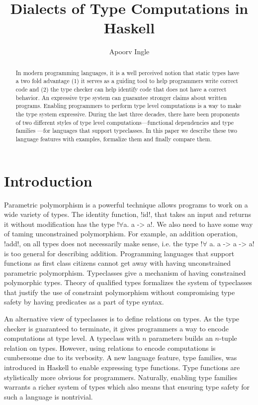 \documentclass[format=sigplan,manuscript,review,screen,nonacm,margin=1in]{acmart}
\title{Dialects of Type Computations in Haskell}
\author{Apoorv Ingle}
\affiliation{%
  \institution{University of Iowa}
  \department{Department of Computer Science}
  \streetaddress{McLean Hall}
  \city{Iowa City}
  \state{Iowa}
  \country{USA}}
\begin{document}
\begin{abstract}
In modern programming languages, it is a well perceived notion
that static types have a two fold advantage (1) it serves as a guiding tool to help programmers
write correct code and (2) the type checker can help identify
code that does not have a correct behavior. An expressive type system
can guarantee stronger claims about written programs. Enabling programmers to perform
type level computations is a way to make the type system expressive.
During the last three decades, there have been proponents
of two different styles of type level computations---functional dependencies and type families
---for languages that support typeclasses. In this paper we describe these two
language features with examples, formalize them and finally compare them.
\end{abstract}
\maketitle

\section{Introduction}
Parametric polymorphism is a powerful technique allows programs to work on
a wide variety of types. The identity function, !id!, that takes an input and returns it
without modification has the type !$\forall$a. a -> a!.
We also need to have some way of taming unconstrained polymorphism.
For example, an addition operation, !add!, on all types does not necessarily make sense,
i.e. the type !$\forall$ a. a -> a -> a! is too general for describing addition.
Programming languages that support functions as first class citizens
cannot get away with having unconstrained parametric polymorphism.
Typeclasses\cite{wadler_polymorphism_1989} give a mechanism
of having constrained polymorphic types. Theory of qualified types\cite{jones_qualified_1994}
formalizes the system of typeclasses that justify the use of constraint polymorphism
without compromising type safety by having predicates as a part of type syntax.

An alternative view of typeclasses is to define relations on types. As the
type checker is guaranteed to terminate, it gives programmers a way to encode computations at type level.
A typeclass with $n$ parameters builds an $n$-tuple relation on types. However, using
relations to encode computations is cumbersome due to its verbosity. A new language feature,
type families\cite{schrijvers_towards_2007}, was introduced in Haskell
to enable expressing type functions. Type functions are stylistically
more obvious for programmers. Naturally, enabling type families warrants a richer system of types
which also means that ensuring type safety for such a language is nontrivial.
\end{document}
